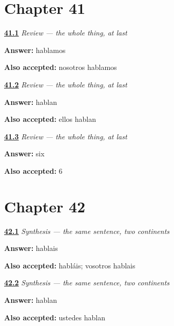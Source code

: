 \section*{Chapter 41}

\noindent\begin{minipage}[t]{\linewidth}
\raggedright
\hyperlink{review-ES-C07-repaso-presente-completo-we}{\textbf{41.1}} \emph{Review — the whole thing, at last}\par
\small \textbf{Answer:} hablamos\par
\footnotesize \textbf{Also accepted:} nosotros hablamos
\end{minipage}\par\medskip

\noindent\begin{minipage}[t]{\linewidth}
\raggedright
\hyperlink{review-ES-C07-repaso-presente-completo-they}{\textbf{41.2}} \emph{Review — the whole thing, at last}\par
\small \textbf{Answer:} hablan\par
\footnotesize \textbf{Also accepted:} ellos hablan
\end{minipage}\par\medskip

\noindent\begin{minipage}[t]{\linewidth}
\raggedright
\hyperlink{review-ES-C07-repaso-presente-completo-count}{\textbf{41.3}} \emph{Review — the whole thing, at last}\par
\small \textbf{Answer:} six\par
\footnotesize \textbf{Also accepted:} 6
\end{minipage}\par\medskip

\section*{Chapter 42}

\noindent\begin{minipage}[t]{\linewidth}
\raggedright
\hyperlink{review-ES-C07-sintesis-dos-continentes-madrid}{\textbf{42.1}} \emph{Synthesis — the same sentence, two continents}\par
\small \textbf{Answer:} hablais\par
\footnotesize \textbf{Also accepted:} habláis; vosotros hablais
\end{minipage}\par\medskip

\noindent\begin{minipage}[t]{\linewidth}
\raggedright
\hyperlink{review-ES-C07-sintesis-dos-continentes-bogota}{\textbf{42.2}} \emph{Synthesis — the same sentence, two continents}\par
\small \textbf{Answer:} hablan\par
\footnotesize \textbf{Also accepted:} ustedes hablan
\end{minipage}\par\medskip

